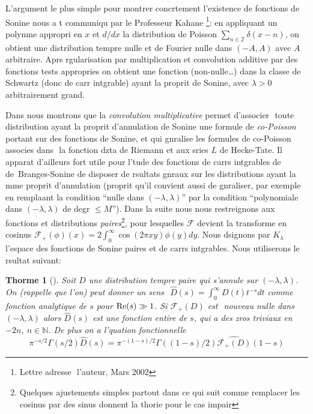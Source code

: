 \documentclass[11pt]{amsart}
\newtheorem{theoreme}{Thorme}[]
\theoremstyle{definition}
\newcommand\NN{{\mathbb N}}
\newcommand\ZZ{{\mathbb Z}}
\newcommand\cF{{\mathcal F}}
\let\wh=\widehat
\renewcommand{\Re}{{\rm Re}}
\let\la=\lambda
\begin{document}
L'argument le plus simple pour montrer concrtement l'existence de
fonctions de Sonine nous a t communiqu par le Professeur Kahane
\footnote{Lettre adresse  l'auteur, Mars 2002}: en appliquant un
polynme appropri en $x$ et $d/dx$  la distribution de Poisson
$\sum_{n\in\ZZ} \delta(x-n)$, on obtient une distribution tempre
nulle et de Fourier nulle dans $(-A,A)$ avec $A$ arbitraire. Aprs
rgularisation par multiplication et convolution additive par des
fonctions tests appropries on obtient une fonction (non-nulle\dots)
dans la classe de Schwartz (donc de carr intgrable) ayant la
proprit de Sonine, avec $\la>0$ arbitrairement grand.

Dans \cite{jfcopoisson} nous montrons que la
\emph{convolution multiplicative} permet d'associer  toute distribution ayant
la proprit d'annulation de Sonine une formule de \emph{co-Poisson} portant sur
des fonctions de Sonine, et
qui gnralise les formules de co-Poisson associes dans \cite{jfhab} 
la fonction dzta de Riemann et aux sries $L$ de
Hecke-Tate. Il apparat d'ailleurs fort utile pour l'tude des
fonctions de carrs intgrables de de~Branges-Sonine de disposer de
rsultats gnraux sur les distributions ayant la mme proprit
d'annulation (proprit qu'il convient aussi de gnraliser, par exemple en
remplaant la condition ``nulle dans $(-\la,\la)$'' par la condition ``polynomiale dans
$(-\la,\la)$ de degr $\leq M$''). Dans la suite nous nous restreignons aux fonctions et
distributions \emph{paires}\footnote{Quelques ajustements simples partout dans ce qui suit
comme remplacer les cosinus par des sinus donnent la thorie pour le cas impair},
pour lesquelles $\cF$ devient la
transforme en cosinus $\cF_+(\phi)(x) = 2\int_0^\infty \cos(2\pi
xy)\phi(y)dy$. Nous dsignons par $K_\la$ l'espace des fonctions de
Sonine paires et de carrs intgrables. Nous utiliserons le rsultat
suivant:

\begin{theoreme}[{\cite{jfcopoisson}}]
Soit $D$ une distribution tempre paire qui s'annule sur
$(-\la,\la)$. On (rappelle que l'on) peut donner un sens  $\wh{D}(s) = \int_0^\infty
D(t)t^{-s}dt$ comme fonction analytique de $s$ pour $\Re(s)\gg 1$. Si
$\cF_+(D)$ est  nouveau nulle dans $(-\la,\la)$ alors $\wh{D}(s)$ est
une fonction entire de $s$, qui a des zros triviaux en $-2n$,
$n\in\NN$. De plus on a l'quation fonctionnelle 
$$\pi^{-s/2}\Gamma(s/2)\wh{D}(s) =
\pi^{-(1-s)/2}\Gamma((1-s)/2)\wh{\cF_+(D)}(1-s)$$
\end{theoreme}
\end{document}
